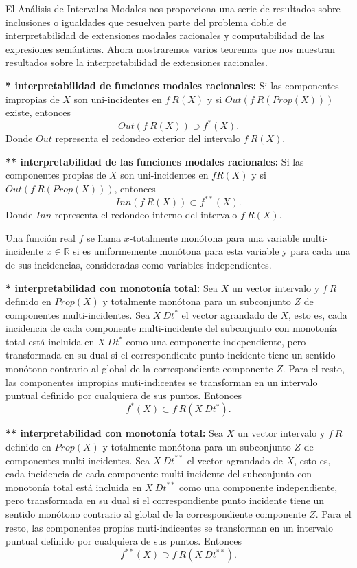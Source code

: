 El Análisis de Intervalos Modales nos proporciona una serie de resultados sobre inclusiones o igualdades que resuelven parte del problema doble de interpretabilidad de extensiones modales racionales y computabilidad de las expresiones semánticas. Ahora mostraremos varios teoremas que nos muestran resultados sobre la interpretabilidad de extensiones racionales.

\begin{theorem}{\textbf{* interpretabilidad de funciones modales racionales:}}\label{th1}
Si las componentes impropias de $X$ son uni-incidentes en $f \ R(X)$ y si $Out(f \ R(Prop(X)))$ existe, entonces
$$Out(f \ R(X)) \supset f^*(X).$$
Donde $Out$ representa el redondeo exterior del intervalo $f \ R(X)$.
\end{theorem}

\begin{theorem}{\textbf{** interpretabilidad de las funciones modales racionales:}}\label{th2}
Si las componentes propias de $X$ son uni-incidentes en $f R(X)$ y si $Out(f \ R(Prop(X)))$, entonces
$$Inn(f \ R(X)) \subset f^{**}(X).$$
Donde $Inn$ representa el redondeo interno del intervalo $f \ R(X)$.
\end{theorem}

Una función real $f$ se llama $x$-totalmente monótona para una variable multi-incidente $x \in \mathbb{R}$ si es uniformemente monótona para esta variable y para cada una de sus incidencias, consideradas como variables independientes.

\begin{theorem}{\textbf{* interpretabilidad con monotonía total:}}\label{th3}
Sea $X$ un vector intervalo y $f \ R$ definido en $Prop(X)$ y totalmente monótona para un subconjunto $Z$ de componentes multi-incidentes. Sea $X \ Dt^*$ el vector agrandado de $X$, esto es, cada incidencia de cada componente multi-incidente del subconjunto con monotonía total está incluida en $X \ Dt^*$ como una componente independiente, pero transformada en su dual si el correspondiente punto incidente tiene un sentido monótono contrario al global de la correspondiente componente $Z$. Para el resto, las componentes impropias muti-indicentes se transforman en un intervalo puntual definido por cualquiera de sus puntos. Entonces
$$f^*(X) \subset f \ R(X \ Dt^*).$$
\end{theorem}

\begin{theorem}{\textbf{** interpretabilidad con monotonía total:}}\label{th4}
Sea $X$ un vector intervalo y $f \ R$ definido en $Prop(X)$ y totalmente monótona para un subconjunto $Z$ de componentes multi-incidentes. Sea $X \ Dt^{**}$ el vector agrandado de $X$, esto es, cada incidencia de cada componente multi-incidente del subconjunto con monotonía total está incluida en $X \ Dt^{**}$ como una componente independiente, pero transformada en su dual si el correspondiente punto incidente tiene un sentido monótono contrario al global de la correspondiente componente $Z$. Para el resto, las componentes propias muti-indicentes se transforman en un intervalo puntual definido por cualquiera de sus puntos. Entonces
$$f^{**}(X) \supset f \ R(X \ Dt^{**}).$$
\end{theorem}

